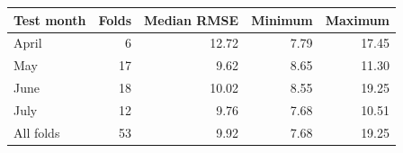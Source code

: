\begin{tabular}{lrrrr}
\toprule
Test month & Folds & Median RMSE & Minimum & Maximum \\
\midrule
April & 6 & 12.72 & 7.79 & 17.45 \\
May & 17 & 9.62 & 8.65 & 11.30 \\
June & 18 & 10.02 & 8.55 & 19.25 \\
July & 12 & 9.76 & 7.68 & 10.51 \\
\midrule
All folds & 53 & 9.92 & 7.68 & 19.25 \\
\bottomrule\end{tabular}
